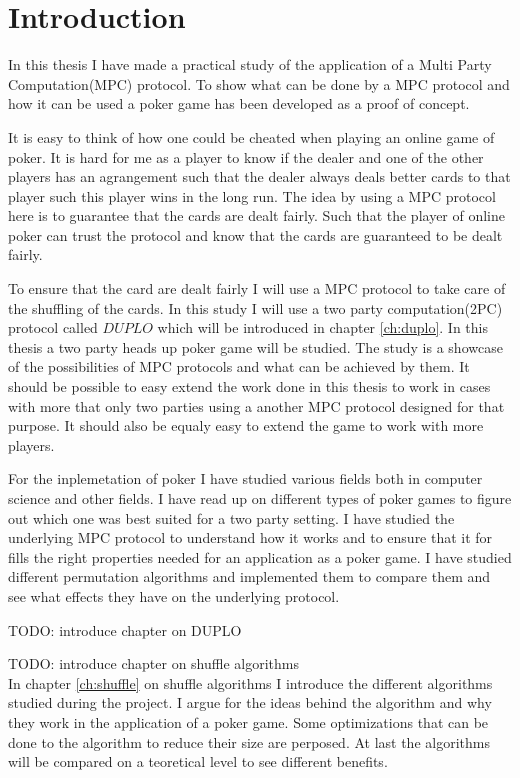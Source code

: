 \documentclass[twoside,11pt,openright]{report}
\newcommand{\todo}[1]{}
\renewcommand{\todo}[1]{{\color{red} TODO: {#1}} \\}
\begin{document}
\chapter{Introduction}
\label{ch:intro}
In this thesis I have made a practical study of the application of a Multi Party Computation(MPC) protocol. To show what can be done by a MPC protocol and how it can be used a poker game has been developed as a proof of concept.

It is easy to think of how one could be cheated when playing an online game of poker. It is hard for me as a player to know if the dealer and one of the other players has an agrangement such that the dealer always deals better cards to that player such this player wins in the long run. The idea by using a MPC protocol here is to guarantee that the cards are dealt fairly. Such that the player of online poker can trust the protocol and know that the cards are guaranteed to be dealt fairly.

To ensure that the card are dealt fairly I will use a MPC protocol to take care of the shuffling of the cards. In this study I will use a two party computation(2PC) protocol called $DUPLO$ which will be introduced in chapter \ref{ch:duplo}. In this thesis a two party heads up poker game will be studied. The study is a showcase of the possibilities of MPC protocols and what can be achieved by them. It should be possible to easy extend the work done in this thesis to work in cases with more that only two parties using a another MPC protocol designed for that purpose. It should also be equaly easy to extend the game to work with more players.

\bigskip

For the inplemetation of poker I have studied various fields both in computer science and other fields. I have read up on different types of poker games to figure out which one was best suited for a two party setting. I have studied the underlying MPC protocol to understand how it works and to ensure that it for fills the right properties needed for an application as a poker game. I have studied different permutation algorithms and implemented them to compare them and see what effects they have on the underlying protocol.

\bigskip
\todo{introduce chapter on DUPLO}

\bigskip

\todo{introduce chapter on shuffle algorithms}
In chapter \ref{ch:shuffle} on shuffle algorithms I introduce the different algorithms studied during the project. I argue for the ideas behind the algorithm and why they work in the application of a poker game. Some optimizations that can be done to the algorithm to reduce their size are perposed. At last the algorithms will be compared on a teoretical level to see different benefits.
\end{document}
